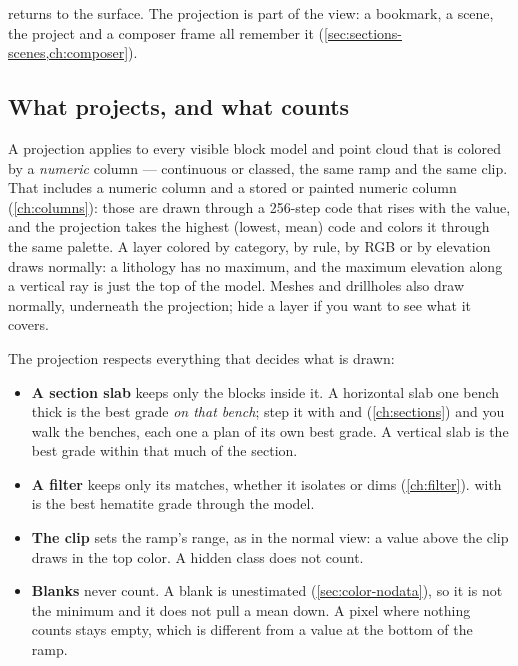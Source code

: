 
 returns to the surface. The projection is part of the view: a bookmark, a scene, the project and a composer frame all remember it (\cref{sec:sections-scenes,ch:composer}).

\subsection{What projects, and what counts}
A projection applies to every visible block model and point cloud that is colored by a \emph{numeric} column — continuous or classed, the same ramp and the same clip. That includes a numeric  column and a stored or painted numeric column (\cref{ch:columns}): those are drawn through a 256-step code that rises with the value, and the projection takes the highest (lowest, mean) code and colors it through the same palette. A layer colored by category, by rule, by RGB or by elevation draws normally: a lithology has no maximum, and the maximum elevation along a vertical ray is just the top of the model. Meshes and drillholes also draw normally, underneath the projection; hide a layer if you want to see what it covers.

The projection respects everything that decides what is drawn:
\begin{itemize}
\item \textbf{A section slab} keeps only the blocks inside it. A horizontal slab one bench thick is the best grade \emph{on that bench}; step it with \key{,} and  (\cref{ch:sections}) and you walk the benches, each one a plan of its own best grade. A vertical slab is the best grade within that much of the section.
\item \textbf{A filter} keeps only its matches, whether it isolates or dims (\cref{ch:filter}).  with  is the best hematite grade through the model.
\item \textbf{The clip} sets the ramp's range, as in the normal view: a value above the clip draws in the top color. A hidden class does not count.
\item \textbf{Blanks} never count. A blank is unestimated (\cref{sec:color-nodata}), so it is not the minimum and it does not pull a mean down. A pixel where nothing counts stays empty, which is different from a value at the bottom of the ramp.
\end{itemize}

